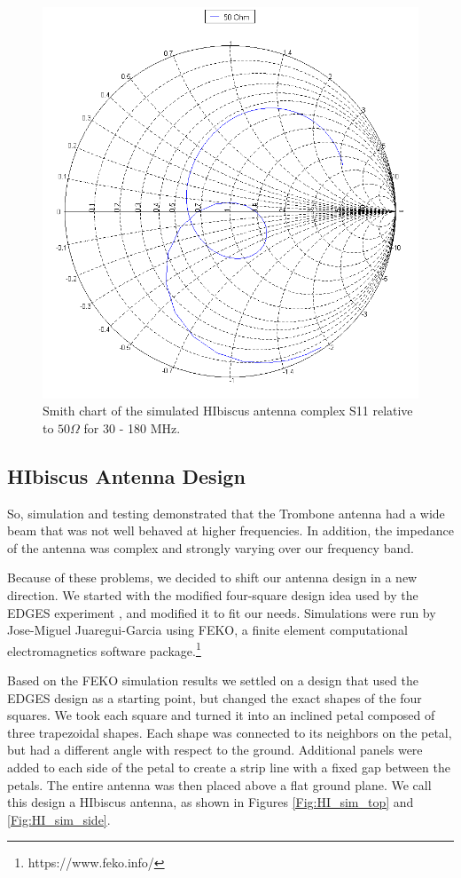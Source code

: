 \begin{figure}[htb]
\begin{minipage}[b]{0.46\textwidth}
\includegraphics[width=0.95\linewidth]{SCIHI_system/figures/HIbiscus_S11_50_Smith.png}
\caption{Smith chart of the simulated HIbiscus antenna complex S11 relative to $50 \Omega$ for 30 - 180 MHz.}
\label{Fig:HIsim_S11_Smith}
\end{minipage}
\end{figure}

\subsection{HIbiscus Antenna Design}
So, simulation and testing demonstrated that the Trombone antenna had a wide beam that was not well behaved at higher frequencies. In addition, the impedance of the antenna was complex and strongly varying over our frequency band. 

Because of these problems, we decided to shift our antenna design in a new direction. We started with the modified four-square design idea used by the EDGES experiment \cite{bowman_2008}\cite{rogers_2008}, and modified it to fit our needs. Simulations were run by Jose-Miguel Juaregui-Garcia using FEKO, a finite element computational electromagnetics software package.\footnote{https://www.feko.info/} 

Based on the FEKO simulation results we settled on a design that used the EDGES design as a starting point, but changed the exact shapes of the four squares. We took each square and turned it into an inclined petal composed of three trapezoidal shapes. Each shape was connected to its neighbors on the petal, but had a different angle with respect to the ground. Additional panels were added to each side of the petal to create a strip line with a fixed gap between the petals. The entire antenna was then placed above a flat ground plane. We call this design a HIbiscus antenna, as shown in Figures \ref{Fig:HI_sim_top} and \ref{Fig:HI_sim_side}. 

